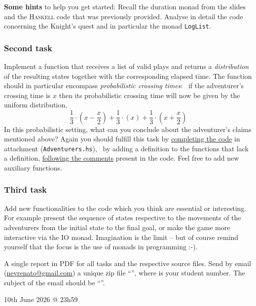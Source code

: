 \documentclass[11pt]{article}
\theoremstyle{myplain}
\theoremstyle{definition} %
\begin{document}
\noindent
\textbf{Some hints} to help you get started: Recall the duration monad from the
slides and the \textsc{Haskell} code that was previously provided. Analyse in
detail the code concerning the Knight's quest and in particular the monad
\texttt{LogList}.

\subsubsection*{Second task}

Implement a function that receives a list of valid plays and returns a
\emph{distribution} of the resulting states together with the corresponding
elapsed time. The function should in particular encompass \emph{probabilistic
crossing times}: \ie\ if the adventurer's crossing time is $x$ then its
probabilistic crossing time will now be given by the uniform distribution,
\[
        \frac{1}{3} \cdot \left ( x - \frac{x}{2} \right ) 
                + \frac{1}{3} \cdot  \left ( x \right )
                + \frac{1}{3} \cdot \left ( x + \frac{x}{2} \right )
\]
In this probabilistic setting, what can you conclude about the adventurer's
claims mentioned above?  Again you should fulfill this task by
\underline{completing the code} in attachment (\texttt{Adventurers.hs}), \ie\
by adding a definition to the functions that lack a definition,
\underline{following the comments} present in the code. Feel free to add new
auxiliary functions.

\subsubsection*{Third task}

Add new functionalities to the code which you think are essential or
interesting. For example present the sequence of states respective to the
movements of the adventurers from the initial state to the final goal, or make
the game more interactive via the IO monad. Imagination is the limit -- but of
course remind yourself that the focus is the use of monads in programming :-).

\bigskip

\begin{mdframed}  
   A single report in PDF for all tasks and the
  respective source files. Send by email (\underline{nevrenato@gmail.com}) a
  unique zip file ``\bash{cf2526-N.zip}'', where \bash{N} is your student
  number. The subject of the email should be ``\bash{cf2526 N}''.

 10th June 2026 @ 23h59
\end{mdframed}
\end{document}

